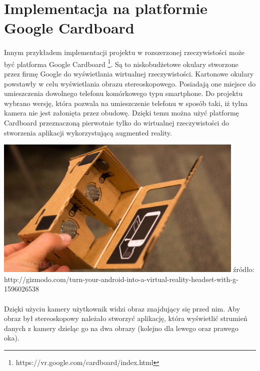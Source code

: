 \documentclass[12pt]{article}
\begin{document}
{{\newpage
\section{Implementacja na platformie Google Cardboard}
\paragraph{}
Innym przykładem implementacji projektu w rozszerzonej rzeczywistości może być platforma Google Cardboard \footnote{https://vr.google.com/cardboard/index.html}. Są to niskobudżetowe okulary stworzone przez firmę Google do wyświetlania wirtualnej rzeczywistości. Kartonowe okulary powstawły w celu wyświetlania obrazu stereoskopowego. Posiadają one miejsce do umieszczenia dowolnego telefonu komórkowego typu smartphone. Do projektu wybrano wersję, która pozwala na umieszczenie telefonu w sposób taki, iż tylna kamera nie jest załonięta przez obudowę. Dzięki temu można użyć platformę Cardboard przeznaczoną pierwotnie tylko do wirtualnej rzeczywistości do stworzenia aplikacji wykorzystującą augmented reality.

\begin{center}
\includegraphics[width=0.9\textwidth]{images/cardboard.jpg}
\small {źródło: http://gizmodo.com/turn-your-android-into-a-virtual-reality-headset-with-g-1596026538 }
\end{center}

\paragraph{}
Dzięki użyciu kamery użytkownik widzi obraz znajdujący się przed nim. Aby obraz był stereoskopowy należało stworzyć aplikację, która wyświetlić strumień danych z kamery dzieląc go na dwa obrazy (kolejno dla lewego oraz prawego oka).

}}
\end{document}
